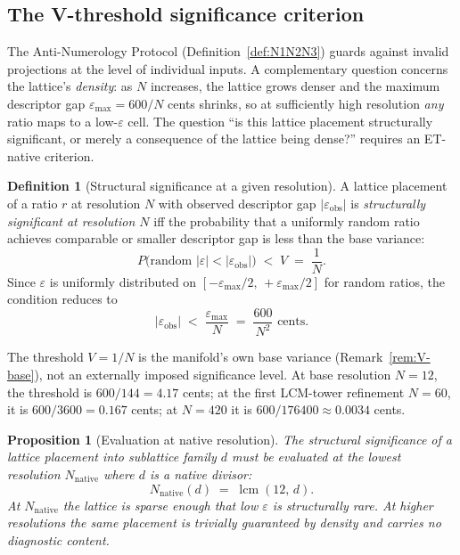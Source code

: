 \documentclass[11pt,a4paper]{article}
\newtheorem{proposition}[theorem]{Proposition}
\theoremstyle{definition}
\newtheorem{definition}[theorem]{Definition}
\theoremstyle{remark}
\DeclareMathOperator{\lcm}{lcm}
\begin{document}
\subsection{The V-threshold significance criterion}\label{subsec:v-threshold}

The Anti-Numerology Protocol (Definition~\ref{def:N1N2N3}) guards against invalid projections at the level of individual inputs. A complementary question concerns the lattice's \emph{density}: as $N$ increases, the lattice grows denser and the maximum descriptor gap $\varepsilon_{\max} = 600/N$ cents shrinks, so at sufficiently high resolution \emph{any} ratio maps to a low-$\varepsilon$ cell. The question ``is this lattice placement structurally significant, or merely a consequence of the lattice being dense?'' requires an ET-native criterion.

\begin{definition}[Structural significance at a given resolution]\label{def:v-threshold}
A lattice placement of a ratio $r$ at resolution $N$ with observed descriptor gap $|\varepsilon_{\text{obs}}|$ is \emph{structurally significant at resolution $N$} iff the probability that a uniformly random ratio achieves comparable or smaller descriptor gap is less than the base variance:
\[
P\bigl(\text{random } |\varepsilon| < |\varepsilon_{\text{obs}}|\bigr) \;<\; V \;=\; \frac{1}{N}.
\]
Since $\varepsilon$ is uniformly distributed on $[-\varepsilon_{\max}/2,\,+\varepsilon_{\max}/2]$ for random ratios, the condition reduces to
\begin{equation}\label{eq:v-threshold}
|\varepsilon_{\text{obs}}| \;<\; \frac{\varepsilon_{\max}}{N} \;=\; \frac{600}{N^{2}} \text{ cents}.
\end{equation}
\end{definition}

The threshold $V = 1/N$ is the manifold's own base variance (Remark~\ref{rem:V-base}), not an externally imposed significance level. At base resolution $N=12$, the threshold is $600/144 = 4.17$ cents; at the first LCM-tower refinement $N=60$, it is $600/3600 = 0.167$ cents; at $N=420$ it is $600/176400 \approx 0.0034$ cents.

\begin{proposition}[Evaluation at native resolution]\label{prop:native-eval}
The structural significance of a lattice placement into sublattice family $d$ must be evaluated at the lowest resolution $N_{\mathrm{native}}$ where $d$ is a native divisor:
\[
N_{\mathrm{native}}(d) \;=\; \lcm(12,\,d).
\]
At $N_{\mathrm{native}}$ the lattice is sparse enough that low $\varepsilon$ is structurally rare. At higher resolutions the same placement is trivially guaranteed by density and carries no diagnostic content.
\end{proposition}
\end{document}
